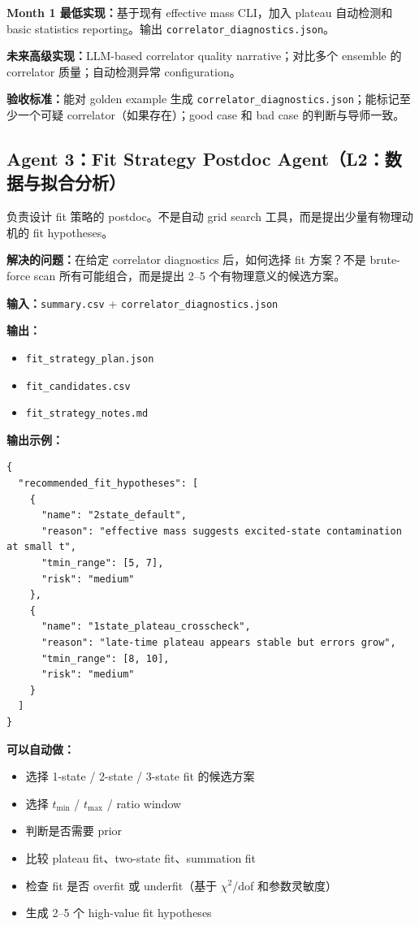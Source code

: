 \documentclass[11pt,a4paper,fontset=fandol]{ctexart}
\begin{document}
\textbf{Month 1 最低实现：}基于现有 effective mass CLI，加入 plateau 自动检测和 basic statistics reporting。输出 \texttt{correlator\_diagnostics.json}。

\textbf{未来高级实现：}LLM-based correlator quality narrative；对比多个 ensemble 的 correlator 质量；自动检测异常 configuration。

\textbf{验收标准：}能对 golden example 生成 \texttt{correlator\_diagnostics.json}；能标记至少一个可疑 correlator（如果存在）；good case 和 bad case 的判断与导师一致。

\subsection{Agent 3：Fit Strategy Postdoc Agent（L2：数据与拟合分析）}

\begin{tcolorbox}[colback=gray!5,colframe=gray!50,title=真实科研组类比]
负责设计 fit 策略的 postdoc。不是自动 grid search 工具，而是提出少量有物理动机的 fit hypotheses。
\end{tcolorbox}

\textbf{解决的问题：}在给定 correlator diagnostics 后，如何选择 fit 方案？不是 brute-force scan 所有可能组合，而是提出 2--5 个有物理意义的候选方案。

\textbf{输入：}\texttt{summary.csv} + \texttt{correlator\_diagnostics.json}

\textbf{输出：}
\begin{itemize}
  \item \texttt{fit\_strategy\_plan.json}
  \item \texttt{fit\_candidates.csv}
  \item \texttt{fit\_strategy\_notes.md}
\end{itemize}

\textbf{输出示例：}
\begin{lstlisting}
{
  "recommended_fit_hypotheses": [
    {
      "name": "2state_default",
      "reason": "effective mass suggests excited-state contamination at small t",
      "tmin_range": [5, 7],
      "risk": "medium"
    },
    {
      "name": "1state_plateau_crosscheck",
      "reason": "late-time plateau appears stable but errors grow",
      "tmin_range": [8, 10],
      "risk": "medium"
    }
  ]
}
\end{lstlisting}

\textbf{可以自动做：}
\begin{itemize}
  \item 选择 1-state / 2-state / 3-state fit 的候选方案
  \item 选择 $t_{\min}$ / $t_{\max}$ / ratio window
  \item 判断是否需要 prior
  \item 比较 plateau fit、two-state fit、summation fit
  \item 检查 fit 是否 overfit 或 underfit（基于 $\chi^2$/dof 和参数灵敏度）
  \item 生成 2--5 个 high-value fit hypotheses
\end{itemize}
\end{document}
